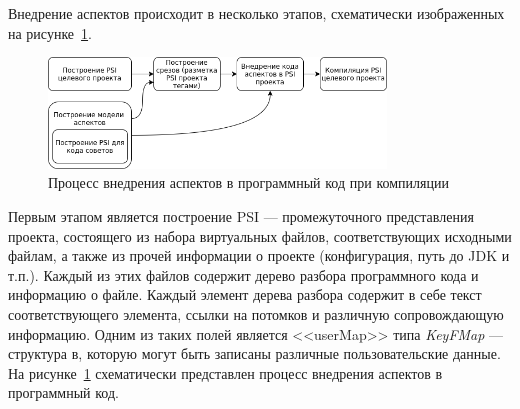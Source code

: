 \documentclass[conference]{IEEEtran}
\begin{document}


Внедрение аспектов происходит в несколько этапов, схематически изображенных на
рисунке~\ref{fig:aspect_weaving}.
\begin{figure}[!t]
\centering
\includegraphics[width=0.8\textwidth]{aspect_weaving}
\caption{Процесс внедрения аспектов в программный код при компиляции}
\label{fig:aspect_weaving}
\end{figure}

Первым этапом является построение PSI --- промежуточного представления проекта, 
состоящего из набора виртуальных файлов, соответствующих исходными файлам, а 
также из прочей информации о проекте (конфигурация, путь до JDK и т.п.).
Каждый из этих файлов содержит дерево разбора программного кода и информацию о
файле.
Каждый элемент дерева разбора содержит в себе текст соответствующего элемента,
ссылки на потомков и различную сопровождающую информацию.
Одним из таких полей является <<userMap>> типа \textit{KeyFMap} --- структура в,
которую могут быть записаны различные пользовательские данные.
На рисунке~\ref{fig:aspect_weaving} схематически представлен процесс внедрения
аспектов в программный код.
\end{document}
